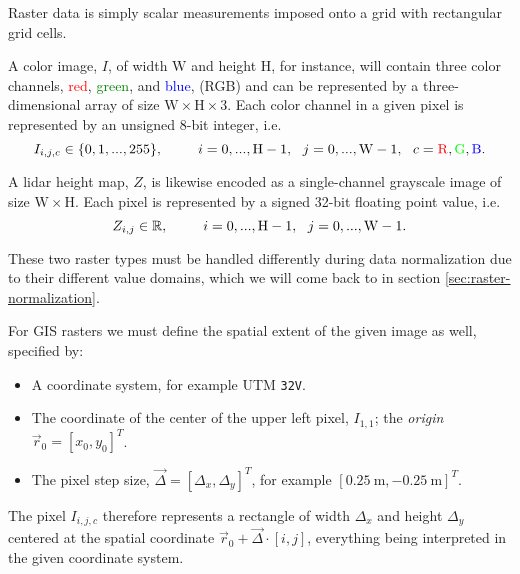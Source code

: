 Raster data is simply scalar measurements imposed onto a grid with rectangular grid cells.

A color image, $I$, of width $\mathrm{W}$ and height $\mathrm{H}$, for instance, will contain three color channels,
\textcolor{red}{red}, \textcolor{green}{green}, and \textcolor{blue}{blue}, (RGB)
and can be represented by a three-dimensional array of size $\mathrm{W} \times \mathrm{H} \times \mathrm{3}$.
Each color channel in a given pixel is represented by an unsigned 8-bit integer, i.e.
\begin{equation*}
  I_{i, j, c} \in \{0, 1, ..., 255\},
  \hspace{2.5em}
  i = 0, ..., \mathrm{H} - 1,
  ~~
  j = 0, ..., \mathrm{W} - 1,
  ~~
  c = \mathrm{\textcolor{red}{R}, \textcolor{green}{G},\textcolor{blue}{B}}.
\end{equation*}

A lidar height map, $Z$, is likewise encoded as a single-channel grayscale image of size $\mathrm{W} \times \mathrm{H}$.
Each pixel is represented by a signed 32-bit floating point value, i.e.
\begin{equation*}
  Z_{i, j} \in \mathbb{R},
  \hspace{2.5em}
  i = 0, ..., \mathrm{H} - 1,
  ~~
  j = 0, ..., \mathrm{W} - 1.
\end{equation*}

These two raster types must be handled differently during data normalization due to their different value domains, which we will come back to in section \ref{sec:raster-normalization}.

\begin{minipage}{\textwidth}
  For GIS rasters we must define the spatial extent of the given image as well, specified by:
  \begin{itemize}[noitemsep]
    \item A coordinate system, for example UTM \texttt{32V}.
    \item The coordinate of the center of the upper left pixel, $I_{1, 1}$; the \textit{origin} $\vec{r}_0 = [x_0, y_0]^T$.
    \item The pixel step size, $\vec{\Delta} = [\Delta_x, \Delta_y]^T$, for example $[\SI{0.25}{\meter}, \SI{-0.25}{\meter}]^T$.
  \end{itemize}
\end{minipage}
\vspace{0.5em}

The pixel $I_{i, j, c}$ therefore represents a rectangle of width $\Delta_x$ and height $\Delta_y$ centered at the spatial coordinate $\vec{r}_0 + \vec{\Delta} \cdot [i, j]$, everything being interpreted in the given coordinate system.

